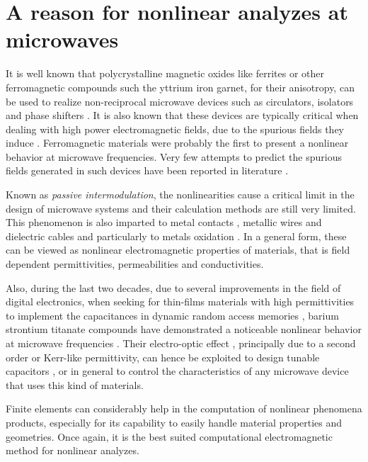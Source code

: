 \section{A reason for nonlinear analyzes at microwaves}

It is well known that polycrystalline magnetic oxides like ferrites or other ferromagnetic compounds such the yttrium iron garnet, for their anisotropy, can be used to realize non-reciprocal microwave devices such as circulators, isolators and phase shifters \cite{pozar1998microwave, adam2002ferrite}. It is also known that these devices are typically critical when dealing with high power electromagnetic fields, due to the spurious fields they induce \cite{suhl1956nonlinear, suhl1957theory, bailey1979study}. Ferromagnetic materials were probably the first to present a nonlinear behavior at microwave frequencies. Very few attempts to predict the spurious fields generated in such devices have been reported in literature \cite{wu1976study, how1997nonlinear}.

Known as \textit{passive intermodulation}, the nonlinearities cause a critical limit in the design of microwave systems \cite{sanford1993passive} and their calculation methods are still very limited. This phenomenon is also imparted to metal contacts \cite{arazm1980nonlinearities}, metallic wires and dielectric cables \cite{amin1978coaxial} and particularly to metals oxidation \cite{bond1979intermodulation}. In a general form, these can be viewed as nonlinear electromagnetic properties of materials, that is field dependent permittivities, permeabilities and conductivities.

Also, during the last two decades, due to several improvements in the field of digital electronics, when seeking for thin-films materials with high permittivities to implement the capacitances in dynamic random access memories \cite{scott1994dielectric, shaw1999effect}, barium strontium titanate compounds have demonstrated a noticeable nonlinear behavior at microwave frequencies \cite{kozyrev1997ferroelectric, mateu2006measurements, mateu2007frequency, giere2007characterization}. Their electro-optic effect \cite{takeda2010dielectric}, principally due to a second order or Kerr-like permittivity, can hence be exploited to design tunable capacitors \cite{sigman2008voltage}, or in general to control the characteristics of any microwave device that uses this kind of materials.

Finite elements can considerably help in the computation of nonlinear phenomena products, especially for its capability to easily handle material properties and geometries. Once again, it is the best suited computational electromagnetic method for nonlinear analyzes.


